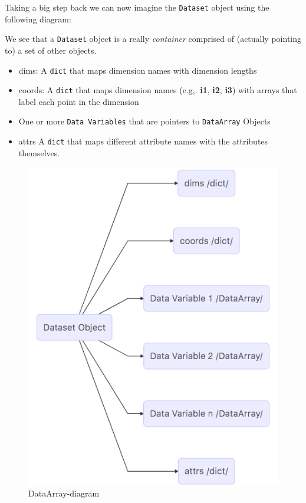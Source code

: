 \documentclass[11pt]{article}
\makeatletter
\def\maxwidth{\ifdim\Gin@nat@width>\linewidth\linewidth
    \else\Gin@nat@width\fi}
\let\Oldincludegraphics\includegraphics
\renewcommand{\includegraphics}[1]{\Oldincludegraphics[width=.8\maxwidth]{#1}}
\providecommand{\tightlist}{%
      \setlength{\itemsep}{0pt}\setlength{\parskip}{0pt}}
\makeatother
\begin{document}
Taking a big step back we can now imagine the \texttt{Dataset} object
using the following diagram:

We see that a \texttt{Dataset} object is a really \emph{container}
comprised of (actually pointing to) a set of other objects.

\begin{itemize}
\tightlist
\item
  dims: A \texttt{dict} that maps dimension names with dimension lengths
\item
  coords: A \texttt{dict} that maps dimension names (e.g,. \textbf{i1},
  \textbf{i2}, \textbf{i3}) with arrays that label each point in the
  dimension
\item
  One or more \texttt{Data\ Variables} that are pointers to
  \texttt{DataArray} Objects
\item
  attrs A \texttt{dict} that maps different attribute names with the
  attributes themselves.
\end{itemize}

\begin{figure}
\centering
\includegraphics{../figures/Dataset-diagram.png}
\caption{DataArray-diagram}
\end{figure}
\end{document}
